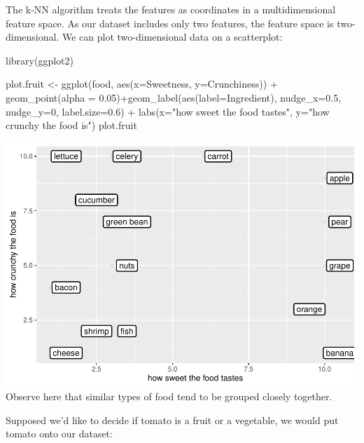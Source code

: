 \documentclass[
]{article}
\newenvironment{Shaded}{\begin{snugshade}}{\end{snugshade}}
\newcommand{\AttributeTok}[1]{\textcolor[rgb]{0.77,0.63,0.00}{#1}}
\newcommand{\DecValTok}[1]{\textcolor[rgb]{0.00,0.00,0.81}{#1}}
\newcommand{\FloatTok}[1]{\textcolor[rgb]{0.00,0.00,0.81}{#1}}
\newcommand{\FunctionTok}[1]{\textcolor[rgb]{0.00,0.00,0.00}{#1}}
\newcommand{\NormalTok}[1]{#1}
\newcommand{\OtherTok}[1]{\textcolor[rgb]{0.56,0.35,0.01}{#1}}
\newcommand{\SpecialCharTok}[1]{\textcolor[rgb]{0.00,0.00,0.00}{#1}}
\newcommand{\StringTok}[1]{\textcolor[rgb]{0.31,0.60,0.02}{#1}}
\begin{document}
The k-NN algorithm treats the features as coordinates in a
multidimensional feature space. As our dataset includes only two
features, the feature space is two-dimensional. We can plot
two-dimensional data on a scatterplot:

\begin{Shaded}
\begin{Highlighting}[]
\FunctionTok{library}\NormalTok{(ggplot2)}

\NormalTok{plot.fruit }\OtherTok{\textless{}{-}} \FunctionTok{ggplot}\NormalTok{(food, }\FunctionTok{aes}\NormalTok{(}\AttributeTok{x=}\NormalTok{Sweetness, }\AttributeTok{y=}\NormalTok{Crunchiness)) }\SpecialCharTok{+} 
  \FunctionTok{geom\_point}\NormalTok{(}\AttributeTok{alpha =} \FloatTok{0.05}\NormalTok{)}\SpecialCharTok{+}\FunctionTok{geom\_label}\NormalTok{(}\FunctionTok{aes}\NormalTok{(}\AttributeTok{label=}\NormalTok{Ingredient),}
                                      \AttributeTok{nudge\_x=}\FloatTok{0.5}\NormalTok{, }\AttributeTok{nudge\_y=}\DecValTok{0}\NormalTok{, }\AttributeTok{label.size=}\FloatTok{0.6}\NormalTok{) }\SpecialCharTok{+} 
  \FunctionTok{labs}\NormalTok{(}\AttributeTok{x=}\StringTok{"how sweet the food tastes"}\NormalTok{, }\AttributeTok{y=}\StringTok{"how crunchy the food is"}\NormalTok{)}
\NormalTok{plot.fruit}
\end{Highlighting}
\end{Shaded}

\includegraphics{classification1_files/figure-latex/unnamed-chunk-56-1.pdf}
Observe here that similar types of food tend to be grouped closely
together.

Supposed we'd like to decide if tomato is a fruit or a vegetable, we
would put tomato onto our dataset:
\end{document}
